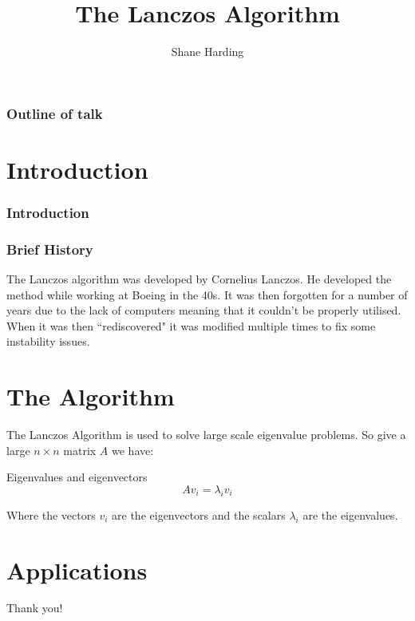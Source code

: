 \documentclass[pdf]{beamer}
\title{The Lanczos Algorithm}
\author{Shane Harding}
\begin{document}
\begin{frame}
\titlepage
\end{frame}


\begin{frame}
\frametitle{Outline of talk}
\tableofcontents[]

\end{frame}


\section{Introduction}

\begin{frame}
\tableofcontents[currentsection]
\end{frame}


\begin{frame}
\frametitle{Introduction}
\centering


\end{frame}

\begin{frame}
\centering
\frametitle{Brief History}
The Lanczos algorithm was developed by Cornelius Lanczos. He developed the method while working at Boeing in the 40s. It was then forgotten for a number of years due to the lack of computers meaning that it couldn't be properly utilised. When it was then ``rediscovered" it was modified multiple times to fix some instability issues.
\end{frame}





\section{The Algorithm}
\begin{frame}
\tableofcontents[currentsection]
\end{frame}



\begin{frame}
The Lanczos Algorithm is used to solve large scale eigenvalue problems. So give a large $n \times n$ matrix $A$ we have:
\begin{exampleblock}{Eigenvalues and eigenvectors}
\[
A v_i = \lambda_i v_i
\]
\end{exampleblock}
Where the vectors $v_i$ are the eigenvectors and the scalars $\lambda_i$ are the eigenvalues.
\end{frame}




\section{Applications}

\begin{frame}
\tableofcontents[currentsection]
\end{frame}



\begin{frame}
\centering
Thank you!
\end{frame}
\end{document}

